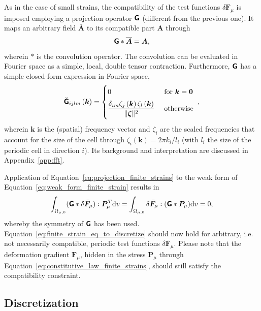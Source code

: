 As in the case of small strains, the compatibility of the test functions \(\delta \bm{F}_\mu\) is imposed employing a projection operator \(\boldsymbol{\mathsf{G}}\) (different from the previous one).
It maps an arbitrary field \(\bar{\bm A}\) to its compatible part \(\bm A\) through
\begin{equation} \label{eq:projection_finite_strains}
\boldsymbol{\mathsf{G}} * \overline{\bm{A}}=\bm{A},
\end{equation}
wherein \(*\) is the convolution operator.
The convolution can be evaluated in Fourier space as a simple, local, double tensor contraction.
Furthermore, \(\boldsymbol{\mathsf{G}}\) has a simple closed-form expression in Fourier space,
\begin{equation} \label{eq:def_projection_finite_strains}
\breve{\boldsymbol{\mathsf{G}}}_{i j l m}\left(\bm{k}\right)=\begin{cases}
0 & \text { for } \bm k=\bm{0} \\[5pt]
\displaystyle{\frac{\delta_{i m} \zeta_{j}\left(\bm{k}\right) \zeta_{l}\left(\bm{k}\right)}{\|\bm{\zeta}\|^{2}} } & \text { otherwise }
\end{cases},
\end{equation}
wherein \(\bm{k}\) is the (spatial) frequency vector and \(\zeta_{i}\) are the scaled frequencies that account for the size of the cell through \(\zeta_{i}(\bm k)=2\pi k_{i} / l_{i}\) (with \(l_{i}\) the size of the periodic cell in direction \(i\)).
Its background and interpretation are discussed in Appendix~\ref{app:fft}.

Application of Equation~\ref{eq:projection_finite_strains} to the weak form of Equation~\ref{eq:weak_form_finite_strain} results in
\begin{equation} \label{eq:finite_strain_eq_to_discretize}
\int_{\Omega_{\mu,0}}(\boldsymbol{\mathsf{G}} * \delta \bar{\bm{F}}_\mu): \bm{P}_\mu^{T} \mathrm{d} v=\int_{\Omega_{\mu,0}} \delta \bar{\bm{F}}_\mu:(\boldsymbol{\mathsf{G}} * \bm{P}_\mu) \mathrm{d} v = 0,
\end{equation}
whereby the symmetry of \(\boldsymbol{\mathsf{G}}\) has been used. Equation~\eqref{eq:finite_strain_eq_to_discretize} should now hold for arbitrary, i.e. not necessarily compatible, periodic test functions \(\delta \bar{\bm{F}}_\mu\).
Please note that the deformation gradient \(\bm{F}_\mu\), hidden in the stress \(\bm{P}_\mu\) through Equation~\eqref{eq:constitutive_law_finite_strains}, should still satisfy the compatibility constraint.

\subsection{Discretization}

